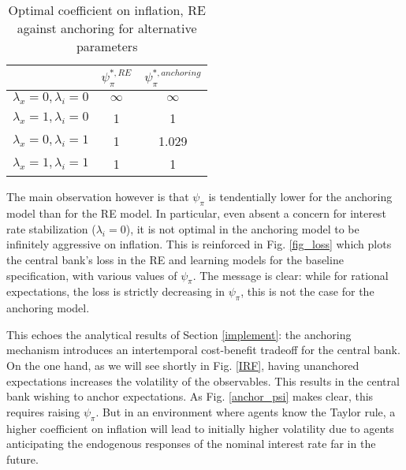 \documentclass[11pt]{article}
\renewcommand{\[}{\begin{equation}}
\renewcommand{\]}{\end{equation}}
\begin{document}
\begin{center}
\begin{table}[h!]
\begin{tabular}{ c | c | c }
 & $\psi^{*,RE}_{\pi}$ & $\psi^{*,anchoring}_{\pi}$  \\  \hline
  $\lambda_x =0, \lambda_i =0 $     & $\infty$  & $\infty$ \\  \hline
 $\lambda_x =1, \lambda_i =0 $ & 1  & 1 \\  \hline
 $\lambda_x =0, \lambda_i =1 $ &  1  & 1.029 \\  \hline
  $\lambda_x =1, \lambda_i =1 $ &  1  & 1 \\  \hline

\end{tabular}     
      \caption{Optimal coefficient on inflation, RE against anchoring for alternative parameters}  \label{par_opt}
 \end{table}
\end{center}


\vspace{-0.8cm}

The main observation however is that $\psi_{\pi}$ is tendentially lower for the anchoring model than for the RE model. In particular, even absent a concern for interest rate stabilization ($\lambda_i = 0$), it is not optimal in the anchoring model to be infinitely aggressive on inflation. This is reinforced in Fig. \ref{fig_loss} which plots the central bank's loss in the RE and learning models for the baseline specification, with various values of $\psi_{\pi}$. The message is clear: while for rational expectations, the loss is strictly decreasing in $\psi_{\pi}$, this is not the case for the anchoring model. 

This echoes the analytical results of Section \ref{implement}: the anchoring mechanism introduces an intertemporal cost-benefit tradeoff for the central bank. On the one hand, as we will see shortly in Fig. \ref{IRF}, having unanchored expectations increases the volatility of the observables. This results in the central bank wishing to anchor expectations. As Fig. \ref{anchor_psi} makes clear, this requires raising $\psi_{\pi}$. But in an environment where agents know the Taylor rule, a higher coefficient on inflation will lead to initially higher volatility due to agents anticipating the endogenous responses of the nominal interest rate far in the future.
\end{document}
